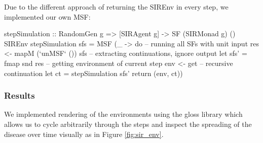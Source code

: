 Due to the different approach of returning the SIREnv in every step, we implemented our own MSF:
\begin{HaskellCode}
stepSimulation :: RandomGen g 
  => [SIRAgent g] -> SF (SIRMonad g) () SIREnv
stepSimulation sfs = MSF (\_ -> do
  -- running all SFs with unit input
  res <- mapM (`unMSF` ()) sfs
  -- extracting continuations, ignore output
  let sfs' = fmap snd res
  -- getting environment of current step   
  env <- get
  -- recursive continuation    
  let ct = stepSimulation sfs'  
  return (env, ct))
\end{HaskellCode}

\subsubsection{Results}
We implemented rendering of the environments using the gloss library which allows us to cycle arbitrarily through the steps and inspect the spreading of the disease over time visually as in Figure \ref{fig:sir_env}.

